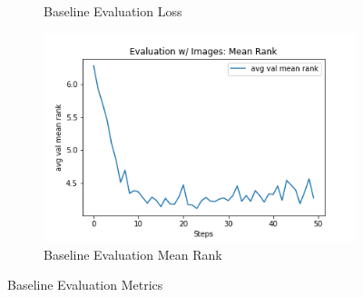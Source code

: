 \begin{figure}[ht!]
\begin{subfigure}[b]{0.3\textwidth}
         \caption{Baseline Evaluation Loss}
         \label{fig:baseline_loss}
     \end{subfigure}
     \hfill
     \begin{subfigure}[b]{0.3\textwidth}
         \centering
         \includegraphics[width=\textwidth]{./figure/results/baseline_and_blindfolding/images/avg val mean rank.png}
         \caption{Baseline Evaluation Mean Rank}
         \label{fig:baseline_mean_rank}
     \end{subfigure}
     \caption{Baseline Evaluation Metrics}
     \label{fig:baseline_metrics}
\end{figure}


